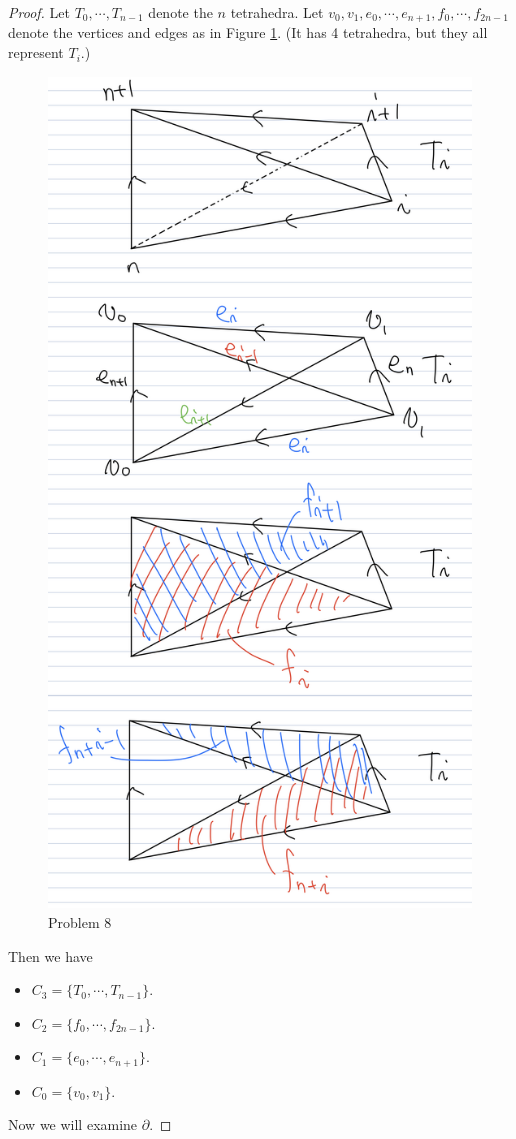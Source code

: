 \documentclass[12pt, psamsfonts]{amsart}
\theoremstyle{definition}
\theoremstyle{remark}
\numberwithin{equation}{section}
\begin{document}
\begin{proof}
  Let $T_0, \cdots, T_{n - 1}$ denote the $n$ tetrahedra.
  Let $v_0, v_1, e_0, \cdots, e_{n + 1}, f_{0}, \cdots, f_{2n - 1}$ denote the vertices and edges as in Figure \ref{fig:lens}.
  (It has 4 tetrahedra, but they all represent $T_i$.)

  \begin{figure}
    \includegraphics[width=.5\linewidth]{lens.jpeg}
    \caption{Problem 8}
    \label{fig:lens}
  \end{figure}

  Then we have
  \begin{itemize}
    \item
      $C_3 = \{ T_0, \cdots, T_{n - 1} \}$.
    \item
      $C_2 = \{ f_0, \cdots, f_{2n - 1} \}$.
    \item
      $C_1 = \{ e_0, \cdots, e_{n + 1} \}$.
    \item
      $C_0 = \{ v_0, v_1 \}$.
  \end{itemize}

  Now we will examine $\partial$.


\end{proof}
\end{document}
